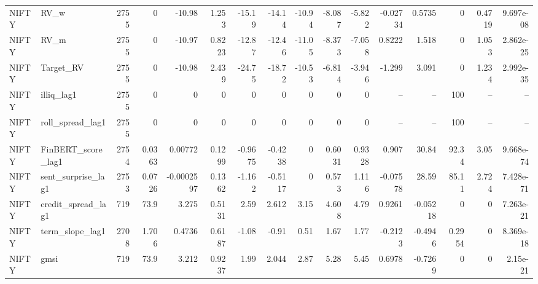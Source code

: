 \begin{table}[htbp]
\begin{tabular}{llrrrrrrrrrrrrrr}
NIFTY & RV\_w & 2755 & 0 & -10.98 & 1.253 & -15.19 & -14.14 & -10.94 & -8.087 & -5.822 & -0.02734 & 0.5735 & 0 & 0.4719 & 9.697e-08 \\
NIFTY & RV\_m & 2755 & 0 & -10.97 & 0.8223 & -12.87 & -12.46 & -11.05 & -8.373 & -7.058 & 0.8222 & 1.518 & 0 & 1.053 & 2.862e-25 \\
NIFTY & Target\_RV & 2755 & 0 & -10.98 & 2.439 & -24.75 & -18.72 & -10.53 & -6.814 & -3.946 & -1.299 & 3.091 & 0 & 1.234 & 2.992e-35 \\
NIFTY & illiq\_lag1 & 2755 & 0 & 0 & 0 & 0 & 0 & 0 & 0 & 0 & -- & -- & 100 & -- & -- \\
NIFTY & roll\_spread\_lag1 & 2755 & 0 & 0 & 0 & 0 & 0 & 0 & 0 & 0 & -- & -- & 100 & -- & -- \\
NIFTY & FinBERT\_score\_lag1 & 2754 & 0.0363 & 0.00772 & 0.1299 & -0.9675 & -0.4238 & 0 & 0.6031 & 0.9328 & 0.907 & 30.84 & 92.34 & 3.05 & 9.668e-74 \\
NIFTY & sent\_surprise\_lag1 & 2753 & 0.0726 & -0.0002597 & 0.1362 & -1.162 & -0.5117 & 0 & 0.573 & 1.116 & -0.07578 & 28.59 & 85.11 & 2.724 & 7.428e-71 \\
NIFTY & credit\_spread\_lag1 & 719 & 73.9 & 3.275 & 0.5131 & 2.59 & 2.612 & 3.15 & 4.608 & 4.79 & 0.9261 & -0.05218 & 0 & 0 & 7.263e-21 \\
NIFTY & term\_slope\_lag1 & 2708 & 1.706 & 0.4736 & 0.6187 & -1.08 & -0.91 & 0.51 & 1.67 & 1.77 & -0.2123 & -0.4946 & 0.2954 & 0 & 8.369e-18 \\
NIFTY & gmsi & 719 & 73.9 & 3.212 & 0.9237 & 1.99 & 2.044 & 2.87 & 5.28 & 5.45 & 0.6978 & -0.7269 & 0 & 0 & 2.15e-21 \\
\bottomrule
\end{tabular}
\end{table}
